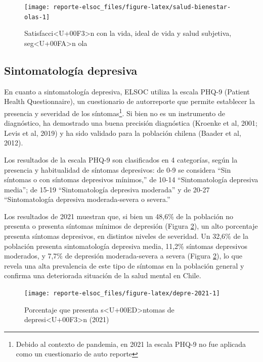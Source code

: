 \documentclass[
  12pt,
]{book}
\begin{document}
\begin{figure}

{\centering \texttt{[image: reporte-elsoc\_files/figure-latex/salud-bienestar-olas-1]} 

}

\caption{Satisfacci<U+00F3>n con la vida, ideal de vida y salud subjetiva, seg<U+00FA>n ola}\label{fig:salud-bienestar-olas}
\end{figure}

\hypertarget{sintomatologuxeda-depresiva}{%
\subsection*{Sintomatología depresiva}\label{sintomatologuxeda-depresiva}}

En cuanto a sintomatología depresiva, ELSOC utiliza la escala PHQ-9 (Patient Health Questionnaire), un cuestionario de autorreporte que permite establecer la presencia y severidad de los síntomas\footnote{Debido al contexto de pandemia, en 2021 la escala PHQ-9 no fue aplicada como un cuestionario de auto reporte}. Si bien no es un instrumento de diagnóstico, ha demostrado una buena precisión diagnóstica (Kroenke et al, 2001; Levis et al, 2019) y ha sido validado para la población chilena (Baader et al, 2012).

Los resultados de la escala PHQ-9 son clasificados en 4 categorías, según la presencia y habitualidad de síntomas depresivos: de 0-9 se considera ``Sin síntomas o con síntomas depresivos mínimos,'' de 10-14 ``Sintomatología depresiva media''; de 15-19 ``Sintomatología depresiva moderada'' y de 20-27 ``Sintomatología depresiva moderada-severa o severa.''

Los resultados de 2021 muestran que, si bien un 48,6\% de la población no presenta o presenta síntomas mínimos de depresión (Figura \ref{fig:depre-2021}), un alto porcentaje presenta síntomas depresivos, en distintos niveles de severidad. Un 32,6\% de la población presenta sintomatología depresiva media, 11,2\% síntomas depresivos moderados, y 7,7\% de depresión moderada-severa a severa (Figura \ref{fig:depre-2021}), lo que revela una alta prevalencia de este tipo de síntomas en la población general y confirma una deteriorada situación de la salud mental en Chile.

\begin{figure}

{\centering \texttt{[image: reporte-elsoc\_files/figure-latex/depre-2021-1]} 

}

\caption{Porcentaje que presenta s<U+00ED>ntomas de depresi<U+00F3>n (2021)}\label{fig:depre-2021}
\end{figure}
\end{document}
